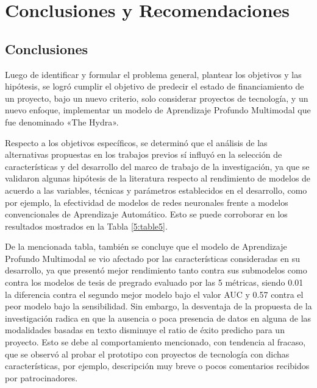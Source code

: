 \chapter{Conclusiones y Recomendaciones}
\section{Conclusiones}
Luego de identificar y formular el problema general, plantear los objetivos y las hipótesis, se logró cumplir el objetivo de predecir el estado de financiamiento de un proyecto, bajo un nuevo criterio, solo considerar proyectos de tecnología, y un nuevo enfoque, implementar un modelo de Aprendizaje Profundo Multimodal que fue denominado «The Hydra».

Respecto a los objetivos específicos, se determinó que el análisis de las alternativas propuestas en los trabajos previos sí influyó en la selección de características y del desarrollo del marco de trabajo de la investigación, ya que se validaron algunas hipótesis de la literatura respecto al rendimiento de modelos de acuerdo a las variables, técnicas y parámetros establecidos en el desarrollo, como por ejemplo, la efectividad de modelos de redes neuronales frente a modelos convencionales de Aprendizaje Automático. Esto se puede corroborar en los resultados mostrados en la Tabla \ref{5:table5}.

De la mencionada tabla, también se concluye que el modelo de Aprendizaje Profundo Multimodal se vio afectado por las características consideradas en su desarrollo, ya que presentó mejor rendimiento tanto contra sus submodelos como contra los modelos de tesis de pregrado evaluado por las 5 métricas, siendo 0.01 la diferencia contra el segundo mejor modelo bajo el valor AUC y 0.57 contra el peor modelo bajo la sensibilidad. Sin embargo, la desventaja de la propuesta de la investigación radica en que la ausencia o poca presencia de datos en alguna de las modalidades basadas en texto disminuye el ratio de éxito predicho para un proyecto. Esto se debe al comportamiento mencionado, con tendencia al fracaso, que se observó al probar el prototipo con proyectos de tecnología con dichas características, por ejemplo, descripción muy breve o pocos comentarios recibidos por patrocinadores.

